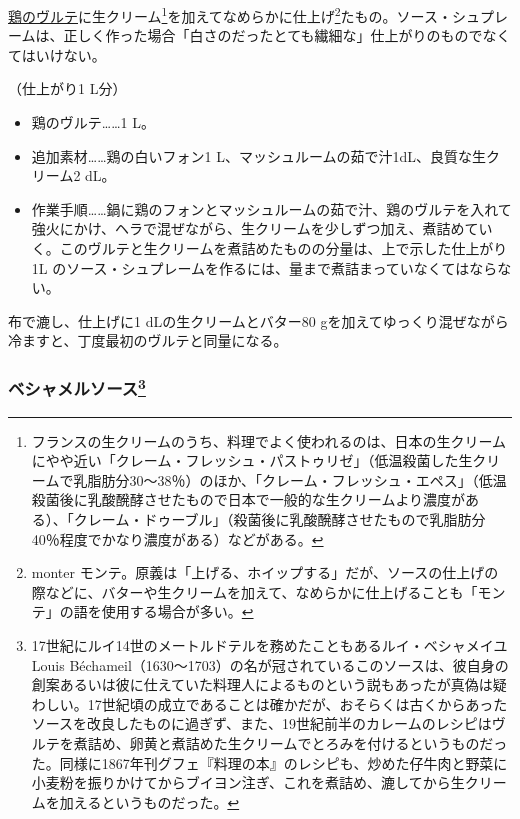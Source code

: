 \begin{recette}
\protect\hyperlink{veloute-de-volaille}{鶏のヴルテ}に生クリーム\footnote{フランスの生クリームのうち、料理でよく使われるのは、日本の生クリームにやや近い「クレーム・フレッシュ・パストゥリゼ」（低温殺菌した生クリームで乳脂肪分30〜38％）のほか、「クレーム・フレッシュ・エペス」（低温殺菌後に乳酸醗酵させたもので日本で一般的な生クリームより濃度がある）、「クレーム・ドゥーブル」（殺菌後に乳酸醗酵させたもので乳脂肪分40％程度でかなり濃度がある）などがある。}を加えてなめらかに仕上げ\footnote{monter
  モンテ。原義は「上げる、ホイップする」だが、ソースの仕上げの際などに、バターや生クリームを加えて、なめらかに仕上げることも「モンテ」の語を使用する場合が多い。}たもの。ソース・シュプレームは、正しく作った場合「白さのだったとても繊細な」仕上がりのものでなくてはいけない。

（仕上がり1 L分）

\begin{itemize}
\item
  鶏のヴルテ\ldots{}\ldots{}1 L。
\item
  追加素材\ldots{}\ldots{}鶏の白いフォン1
  L、マッシュルームの茹で汁1dL、良質な生クリーム2 \undemi{} dL。
\item
  作業手順\ldots{}\ldots{}鍋に鶏のフォンとマッシュルームの茹で汁、鶏のヴルテを入れて強火にかけ、ヘラで混ぜながら、生クリームを少しずつ加え、煮詰めていく。このヴルテと生クリームを煮詰めたものの分量は、上で示した仕上がり1L
  のソース・シュプレームを作るには、\untiers{}量まで煮詰まっていなくてはならない。
\end{itemize}

布で漉し、仕上げに1 dLの生クリームとバター80
gを加えてゆっくり混ぜながら冷ますと、丁度最初のヴルテと同量になる。

\hypertarget{sauce-bechamel}{%
\subsubsection[ベシャメルソース]{\texorpdfstring{ベシャメルソース\footnote{17世紀にルイ14世のメートルドテルを務めたこともあるルイ・ベシャメイユLouis
  Béchameil（1630〜1703）の名が冠されているこのソースは、彼自身の創案あるいは彼に仕えていた料理人によるものという説もあったが真偽は疑わしい。17世紀頃の成立であることは確かだが、おそらくは古くからあったソースを改良したものに過ぎず、また、19世紀前半のカレームのレシピはヴルテを煮詰め、卵黄と煮詰めた生クリームでとろみを付けるというものだった。同様に1867年刊グフェ『料理の本』のレシピも、炒めた仔牛肉と野菜に小麦粉を振りかけてからブイヨン注ぎ、これを煮詰め、漉してから生クリームを加えるというものだった。}}{ベシャメルソース}}\label{sauce-bechamel}}


\end{recette}
